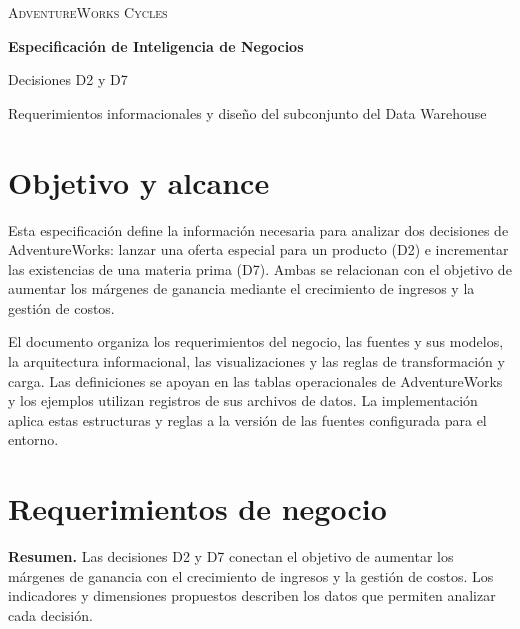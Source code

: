 \documentclass[10pt,a4paper]{article}
\begin{document}
\hypersetup{pageanchor=false}

\begin{titlepage}
\centering
\vspace*{2cm}
{\Large\textsc{AdventureWorks Cycles}\par}
\vspace{1.2cm}
{\huge\bfseries Especificación de Inteligencia de Negocios\par}
\vspace{0.6cm}
{\LARGE Decisiones D2 y D7\par}
\vspace{1.2cm}
{\large Requerimientos informacionales y diseño del subconjunto del Data Warehouse\par}
\vfill
\end{titlepage}
\hypersetup{pageanchor=true}

\section{Objetivo y alcance}

Esta especificación define la información necesaria para analizar dos
decisiones de AdventureWorks: lanzar una oferta especial para un producto
(D2) e incrementar las existencias de una materia prima (D7). Ambas se
relacionan con el objetivo de aumentar los márgenes de ganancia mediante el
crecimiento de ingresos y la gestión de costos.

El documento organiza los requerimientos del negocio, las fuentes y sus
modelos, la arquitectura informacional, las visualizaciones y las reglas de
transformación y carga. Las definiciones se apoyan en las tablas operacionales
de AdventureWorks y los ejemplos utilizan registros de sus archivos de datos.
La implementación aplica estas estructuras y reglas a la versión de las
fuentes configurada para el entorno.

\section{Requerimientos de negocio}

\textbf{Resumen.} Las decisiones D2 y D7 conectan el objetivo de aumentar los
márgenes de ganancia con el crecimiento de ingresos y la gestión de costos.
Los indicadores y dimensiones propuestos describen los datos que permiten
analizar cada decisión.
\end{document}
